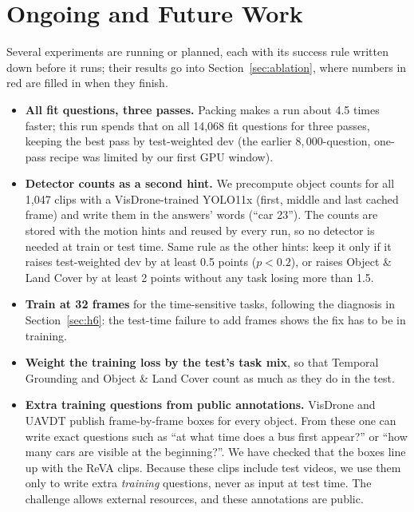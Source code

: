 \section{Ongoing and Future Work}
\label{sec:wip}
Several experiments are running or planned, each with its success rule
written down before it runs; their results go into
Section~\ref{sec:ablation}, where numbers in red are filled in when they
finish.

\begin{itemize}
\item \textbf{All fit questions, three passes.} Packing makes a run about
4.5 times faster; this run spends that on all 14,068 fit questions for
three passes, keeping the best pass by test-weighted dev (the earlier
$8{,}000$-question, one-pass recipe was limited by our first GPU window).
\item \textbf{Detector counts as a second hint.} We precompute object counts
for all 1,047 clips with a VisDrone-trained YOLO11x (first, middle and last
cached frame) and write them in the answers' words (``car 23''). The counts
are stored with the motion hints and reused by every run, so no detector is
needed at train or test time. Same rule as the other hints: keep it only if
it raises test-weighted dev by at least 0.5 points ($p<0.2$), or raises
Object \& Land Cover by at least 2 points without any task losing more than
1.5.
\item \textbf{Train at 32 frames} for the time-sensitive tasks, following
the diagnosis in Section~\ref{sec:h6}: the test-time failure to add frames
shows the fix has to be in training.
\item \textbf{Weight the training loss by the test's task mix}, so that
Temporal Grounding and Object \& Land Cover count as much as they do in
the test.
\item \textbf{Extra training questions from public annotations.} VisDrone
and UAVDT publish frame-by-frame boxes for every object. From these one can
write exact questions such as ``at what time does a bus first appear?''
or ``how many cars are visible at the beginning?''. We have checked that
the boxes line up with the ReVA clips. Because these clips include test
videos, we use them only to write extra \emph{training} questions, never
as input at test time. The challenge allows external resources, and these
annotations are public.
\end{itemize}

